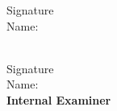 \vspace{0.5cm}
\begin{center}
\hspace*{3.2cm}Signature \\
\hspace*{2.7cm}Name: \\
\\
\end{center}



\vspace{-2.2cm}
\hspace*{-0.7cm} Signature \\
Name: \\
{\bf{Internal Examiner}} \\

